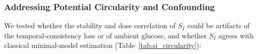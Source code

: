 \documentclass[journal]{IEEEtran}
\begin{document}
\begin{table}[t]
\centering
\caption{Pre-specified checks of insulin sensitivity}
\label{tab:si}
\footnotesize
{}
\end{table}

\subsubsection{Addressing Potential Circularity and Confounding}
We tested whether the stability and dose correlation of $S_I$ could be artifacts of the temporal-consistency loss or of ambient glucose, and whether $S_I$ agrees with classical minimal-model estimation (Table~\ref{tab:si_circularity}):
\end{document}
